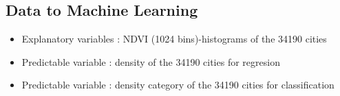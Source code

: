 \documentclass[c]{beamer}
\begin{document}
\subsection{Data to Machine Learning}
\begin{frame}
 \begin{itemize}
  \item Explanatory variables : NDVI (1024 bins)-histograms of the 34190 cities
  \item Predictable variable : density of the 34190 cities for regresion
  \item Predictable variable : density category of the 34190 cities for classification
 \end{itemize}
 
\begin{columns}
\begin{column}{0.8\textwidth}
\begin{table}
\begin{center}
\begin{adjustbox}{max width=0.9\textwidth}
\begin{tabular}{|c|c|c|c|c|c|c|c|c|c|c|}


\end{tabular}
\end{adjustbox}
\end{center}
\end{table}
\end{column}
\end{columns}
\end{frame}
\end{document}
